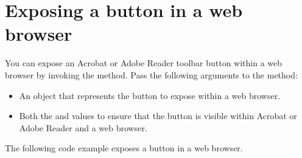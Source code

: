 \documentclass[letterpaper,12pt,english,openany,oneside]{sphinxmanual}
\begin{document}
\section{Exposing a button in a web browser}
\label{\detokenize{Plugins_Toolbutton:exposing-a-button-in-a-web-browser}}
You can expose an Acrobat or Adobe Reader toolbar button within a web browser by invoking the  method. Pass the following arguments to the  method:
\begin{itemize}
\item {} 
An  object that represents the button to expose within a web browser.

\item {} 
Both the  and  values to ensure that the button is visible within Acrobat or Adobe Reader and a web browser.

\end{itemize}

The following code example exposes a button in a web browser.
\end{document}
